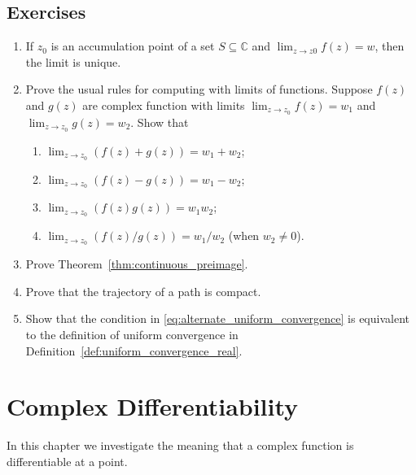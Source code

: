 \section*{Exercises}
\renewcommand{\labelenumi}{\arabic{enumi}}
\begin{enumerate}
\item If $z_0$ is an accumulation point of a set $S\subseteq \mathbb{C}$ and $\lim_{z\rightarrow z0} f(z) = w$, then the limit is unique. \label{exercise:unique_limit}

\item Prove the usual rules for computing with limits of functions. Suppose $f(z)$ and $g(z)$ are complex function with limits $\lim_{z\rightarrow z_0} f(z) = w_1$ and $\lim_{z\rightarrow z_0} g(z) = w_2$. Show that
\begin{enumerate}
	\item $\lim_{z\rightarrow z_0} (f(z)+g(z)) = w_1+w_2$;
	\item $\lim_{z\rightarrow z_0} (f(z)-g(z)) = w_1-w_2$;
	\item $\lim_{z\rightarrow z_0} (f(z)g(z)) = w_1w_2$;
	\item $\lim_{z\rightarrow z_0} (f(z)/g(z)) = w_1/w_2$ (when $w_2\neq 0$).
\end{enumerate}

\item \label{exercise:continuous_preimage} Prove Theorem~\ref{thm:continuous_preimage}.

\item Prove that the trajectory of a path is  compact.

\item Show that the condition in \eqref{eq:alternate_uniform_convergence} is equivalent to the definition of uniform convergence in Definition~\ref{def:uniform_convergence_real}.


\end{enumerate}




\chapter{Complex Differentiability}

In this chapter we investigate the meaning that a complex function is differentiable at a point.





